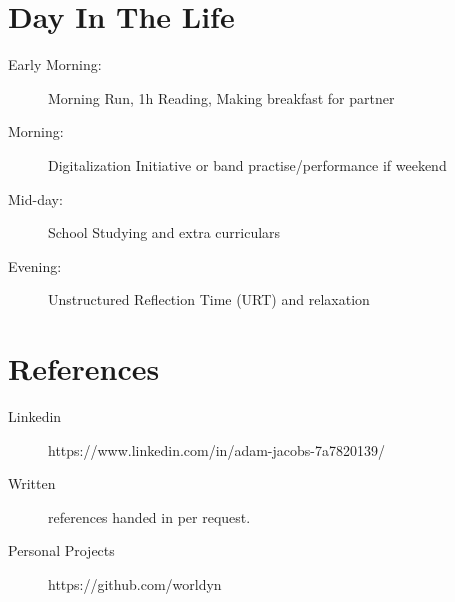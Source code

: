 \documentclass[margin,line,a4paper]{resume}
\begin{document}
\begin{resume}
\section{\mysidestyle Day In The Life}\vspace{1mm}
    \begin{description}
        \item[Early Morning:] Morning Run, 1h Reading, Making breakfast for partner
        \item[Morning:] Digitalization Initiative or band practise/performance if weekend
        \item[Mid-day:] School Studying and extra curriculars
         \item[Evening:] Unstructured Reflection Time (URT) and relaxation
    \end{description} 

\section{\mysidestyle References}
\begin{description}
    \item[Linkedin] https://www.linkedin.com/in/adam-jacobs-7a7820139/
    \item[Written] references handed in per request.
    \item[Personal Projects] https://github.com/worldyn
\end{description}

\end{resume}
\end{document}
